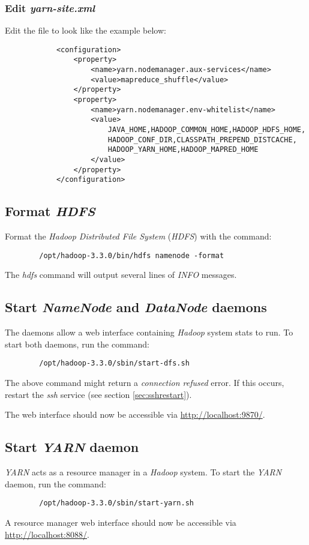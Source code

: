 \documentclass{article}
\begin{document}
        \subsubsection{Edit \emph{yarn-site.xml}}
        Edit the file  to look like the example below:
        \begin{verbatim}
            <configuration>
                <property>
                    <name>yarn.nodemanager.aux-services</name>
                    <value>mapreduce_shuffle</value>
                </property>
                <property>
                    <name>yarn.nodemanager.env-whitelist</name>
                    <value>
                        JAVA_HOME,HADOOP_COMMON_HOME,HADOOP_HDFS_HOME,
                        HADOOP_CONF_DIR,CLASSPATH_PREPEND_DISTCACHE,
                        HADOOP_YARN_HOME,HADOOP_MAPRED_HOME
                    </value>
                </property>
            </configuration>
        \end{verbatim}

    \subsection{Format \emph{HDFS}}
    Format the \emph{Hadoop Distributed File System} (\emph{HDFS}) with the command:
    \begin{verbatim}
        /opt/hadoop-3.3.0/bin/hdfs namenode -format
    \end{verbatim}
    The \emph{hdfs} command will output several lines of \emph{INFO} messages.

    \subsection{Start \emph{NameNode} and \emph{DataNode} daemons}
    The daemons allow a web interface containing \emph{Hadoop} system stats to run. To start both
    daemons, run the command:
    \begin{verbatim}
        /opt/hadoop-3.3.0/sbin/start-dfs.sh
    \end{verbatim}
    The above command might return a \emph{connection refused} error. If this occurs, restart
    the \emph{ssh} service (see section \ref{sec:sshrestart}).
    
    The web interface should now be accessible via \url{http://localhost:9870/}.

    \subsection{Start \emph{YARN} daemon}
    \emph{YARN} acts as a resource manager in a \emph{Hadoop} system. To start the \emph{YARN} daemon,
    run the command:
    \begin{verbatim}
        /opt/hadoop-3.3.0/sbin/start-yarn.sh
    \end{verbatim}
    A resource manager web interface should now be accessible via \url{http://localhost:8088/}.
\end{document}
